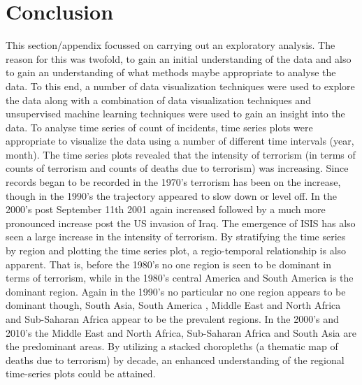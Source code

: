 \section{Conclusion}
This section/appendix focussed on carrying out an exploratory analysis. The reason for this was twofold, to gain an initial understanding of the data and also to gain an understanding of what methods maybe appropriate to analyse the data. To this end, a number of data visualization techniques were used to explore the data along with a combination of data visualization techniques and unsupervised machine learning techniques were used to gain an insight into the data. To analyse time series of count of incidents, time series plots were appropriate to visualize the data using a number of different time intervals (year, month). The time series plots revealed that the intensity of terrorism (in terms of counts of terrorism and counts of deaths due to terrorism) was increasing. Since records began to be recorded in the 1970’s terrorism has been on the increase, though in the 1990’s the trajectory appeared to slow down or level off. In the 2000’s post September 11th 2001 again increased followed by a much more pronounced increase post the US invasion of Iraq. The emergence of ISIS has also seen a large increase in the intensity of terrorism. 
By stratifying the time series by region and plotting the time series plot, a regio-temporal relationship is also apparent. That is, before the 1980’s no one region is seen to be dominant in terms of terrorism, while in the 1980’s central America and South America is the dominant region. Again in the 1990’s no particular no one region appears to be dominant though, South Asia, South America , Middle East and North Africa and Sub-Saharan Africa appear to be the prevalent regions. In the 2000’s and 2010’s  the Middle East and North Africa, Sub-Saharan Africa and South Asia are the predominant areas.  By utilizing a stacked choropleths (a thematic map of deaths due to terrorism) by decade, an enhanced understanding of the regional time-series plots could be attained. 

